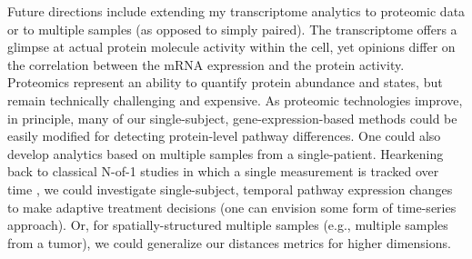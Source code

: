 %

Future directions include extending my transcriptome analytics to proteomic data or to multiple samples (as opposed to simply paired). The transcriptome offers a glimpse at actual protein molecule activity within the cell, yet opinions differ on the correlation between the mRNA expression and the protein activity. Proteomics represent an ability to quantify protein abundance and states, but remain technically challenging and expensive. As proteomic technologies improve, in principle, many of our single-subject, gene-expression-based methods could be easily modified for detecting protein-level pathway differences. One could also develop analytics based on multiple samples from a single-patient. Hearkening back to classical N-of-1 studies in which a single measurement is tracked over time \citep{Nikles2015}, we could investigate single-subject, temporal pathway expression changes to make adaptive treatment decisions (one can envision some form of time-series approach). Or, for spatially-structured multiple samples (e.g., multiple samples from a tumor), we could generalize our distances metrics for higher dimensions.
